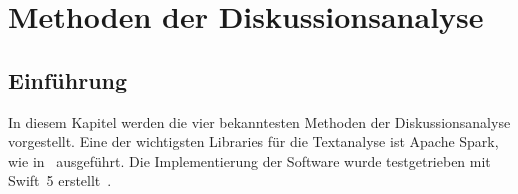 \chapter{Methoden der Diskussionsanalyse}\label{cha:methods}
\section{Einführung}
In diesem Kapitel werden die vier bekanntesten Methoden der Diskussionsanalyse vorgestellt. Eine der wichtigsten Libraries für die Textanalyse ist Apache Spark, wie in~\cite{text_analysis_python:_2015} ausgeführt. Die Implementierung der Software wurde testgetrieben mit Swift~5 erstellt~\cite{reid_ios_2020}.
